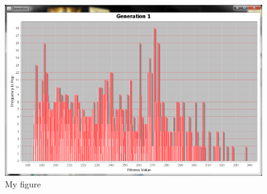 \documentclass[12pt]{article}
\begin{document}
\begin{figure} [ht]
\centering
\includegraphics[scale = 0.25]{gen1-2500.png}
\caption{My figure}
\label{the-label-for-cross-referencing}
\end{figure}




\end{document}
